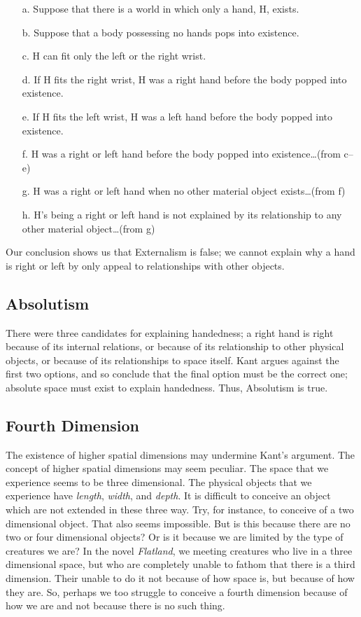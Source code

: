\documentclass[oneside]{article}
\begin{document}
\begin{enumerate}

\item[a.] 
  Suppose that there is a world in which only a hand, H, exists.
\item[b.]
  Suppose that a body possessing no hands pops into existence.
\item[c.]
  H can fit only the left or the right wrist.
\item[d.]
  If H fits the right wrist, H was a right hand before the body popped
  into existence.
\item[e.]
  If H fits the left wrist, H was a left hand before the body popped
  into existence.
\item[f.]
  H was a right or left hand before the body popped into
  existence\ldots{}(from c--e)
\item[g.]
  H was a right or left hand when no other material object
  exists\ldots{}(from f)
\item[h.]
  H's being a right or left hand is not explained by its relationship to
  any other material object\ldots{}(from g)
\end{enumerate}
Our conclusion shows us that Externalism is false; we cannot explain why a hand is right or left by only appeal to relationships with other objects. 


\subsection*{Absolutism}\label{absolutism}

There were three candidates for explaining handedness; a right hand is right because of its internal relations, or because of its relationship to other physical objects, or because of its relationships to space itself. Kant argues against the first two options, and so conclude that the final option must be the correct one; absolute space must exist to explain handedness. Thus, Absolutism is true. 


\subsection*{Fourth Dimension}

The existence of higher spatial dimensions may undermine Kant's argument.  The concept of higher spatial dimensions may seem peculiar. The space that we experience seems to be three dimensional. The physical objects that we experience have \emph{length}, \emph{width}, and \emph{depth}. It is difficult to conceive an object which are not extended in these three way. Try, for instance, to conceive of a two dimensional object. That also seems impossible. But is this because there are no two or four dimensional objects? Or is it because we are limited by the type of creatures we are? In the novel \emph{Flatland}, we meeting creatures who live in a three dimensional space, but who are completely unable to fathom that there is a third dimension. Their unable to do it not because of how space is, but because of how they are. So, perhaps we too struggle to conceive a fourth dimension because of how we are and not because there is no such thing. 
\end{document}
